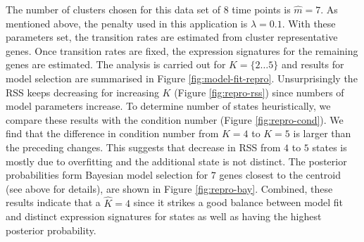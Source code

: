 The number of clusters chosen for this data set of $8$ time points is $\hat{m} = 7$. As mentioned above, the penalty used in this application is $\lambda = 0.1$. With these parameters set, the transition rates are estimated from cluster representative genes. Once transition rates are fixed, the expression signatures for the remaining genes are estimated. The analysis is carried out for $K = \lbrace 2 \ldots 5 \rbrace $ and results for model selection are summarised in Figure \ref{fig:model-fit-repro}. Unsurprisingly the RSS keeps decreasing for increasing $K$ (Figure \ref{fig:repro-rss}) since numbers of model parameters increase. To determine number of states heuristically, we compare these results with the condition number (Figure \ref{fig:repro-cond}). We find that the difference in condition number from $K=4$ to $K=5$ is larger than the preceding changes. This suggests that decrease in RSS from $4$ to $5$ states is mostly due to overfitting and the additional state is not distinct. The posterior probabilities form Bayesian model selection for $7$  genes closest to the centroid (see above for details), are shown in Figure \ref{fig:repro-bay}. Combined, these results indicate that a $\hat{K} = 4$ since it strikes a good balance between model fit and distinct expression signatures for states as well as having the highest posterior probability.

